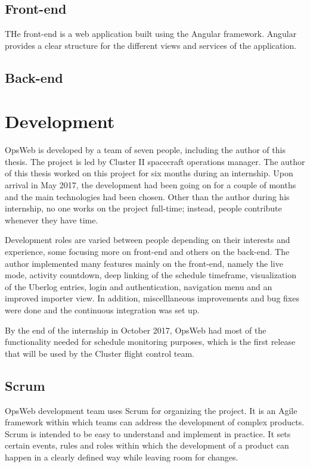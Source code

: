 \subsection{Front-end}
THe front-end is a web application built using the Angular framework. Angular provides a clear structure for the different views and services of the application.
\cite{angular, d3js}
\subsection{Back-end}
\cite{django}
\section{Development}
OpsWeb is developed by a team of seven people, including the author of this thesis. The project is led by Cluster II spacecraft operations manager. The author of this thesis worked on this project for six months during an internship. Upon arrival in May 2017, the development had been going on for a couple of months and the main technologies had been chosen. Other than the author during his internship, no one works on the project full-time; instead, people contribute whenever they have time.

Development roles are varied between people depending on their interests and experience, some focusing more on front-end and others on the back-end. The author implemented many features mainly on the front-end, namely the live mode, activity countdown, deep linking of the schedule timeframe, visualization of the Uberlog entries, login and authentication, navigation menu and an improved importer view. In addition, miscelllaneous improvements and bug fixes were done and the continuous integration was set up.

By the end of the internship in October 2017, OpsWeb had most of the functionality needed for schedule monitoring purposes, which is the first release that will be used by the Cluster flight control team.
\subsection{Scrum}
OpsWeb development team uses Scrum for organizing the project. It is an Agile framework within which teams can address the development of complex products. Scrum is intended to be easy to understand and implement in practice. It sets certain events, rules and roles within which the development of a product can happen in a clearly defined way while leaving room for changes.

